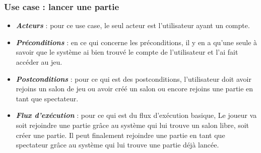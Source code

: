 \documentclass[10pt,a4paper]{article}
\begin{document}
\subsubsection{Use case : lancer une partie}
\begin{itemize}
\item \textit{\textbf{Acteurs}} : pour ce use case, le seul acteur est l'utilisateur ayant un compte.\\

\item \textit{\textbf{Préconditions}} : en ce qui concerne les préconditions, il y en a qu'une seule à savoir que le système ai bien trouvé le compte de l'utilisateur et l'ai fait accéder au jeu.\\

\item \textit{\textbf{Postconditions}} : pour ce qui est des postconditions, l'utilisateur doit avoir rejoins un salon de jeu ou avoir créé un salon ou encore rejoins une partie en tant que spectateur.\\

\item \textit{\textbf{Flux d'exécution}} : pour ce qui est du flux d'exécution basique, Le joueur va soit rejoindre une partie grâce au système qui lui trouve un salon libre, soit créer une partie. Il peut finalement rejoindre une partie en tant que spectateur grâce au système qui lui trouve une partie déjà lancée. \\

\end{itemize} 
\end{document}
